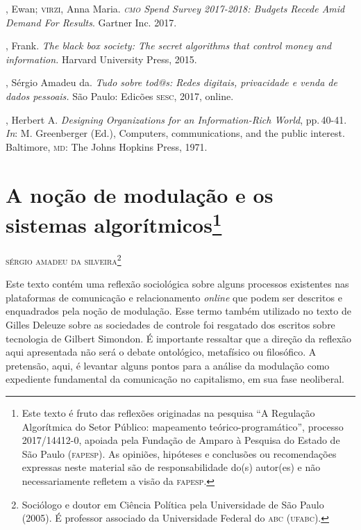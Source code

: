 \begin{bibliohedra}
, Ewan; \textsc{virzi}, Anna Maria. \emph{\textsc{cmo} Spend Survey 2017-2018:
Budgets Recede Amid Demand For Results}. Gartner Inc. 2017.

, Frank. \emph{The black box society: The secret algorithms
that control money and information.} Harvard University Press, 2015.

, Sérgio Amadeu da. \emph{Tudo sobre tod@s: Redes digitais,
privacidade e venda de dados pessoais.} São Paulo: Edicões \textsc{sesc}, 2017,
online.

, Herbert A. \emph{Designing Organizations for an
Information-Rich World}, pp.\,40-41. \emph{In}: M. Greenberger (Ed.), Computers,
communications, and the public interest. Baltimore, \textsc{md}: The Johns
Hopkins Press, 1971.

\end{bibliohedra}


\chapter{A noção de modulação e os sistemas algorítmicos\footnote{Este texto é fruto das reflexões originadas na pesquisa ``A Regulação Algorítmica do Setor Público: mapeamento teórico-programático'', processo 2017/14412-0, apoiada pela Fundação de Amparo à Pesquisa do Estado de São Paulo (\textsc{fapesp}). As opiniões, hipóteses e conclusões ou recomendações expressas neste material são de responsabilidade do(s) autor(es) e não necessariamente refletem a visão da \textsc{fapesp}.}}

\begin{flushright}
\textsc{sérgio amadeu da silveira\footnote{Sociólogo e doutor em Ciência Política pela Universidade de São Paulo (2005). É professor associado da Universidade Federal do \textsc{abc} (\textsc{ufabc}).}}
\end{flushright}

\noindent{}Este texto contém uma reflexão sociológica sobre alguns processos
existentes nas plataformas de comunicação e relacionamento \emph{online} que
podem ser descritos e enquadrados pela noção de modulação. Esse termo
também utilizado no texto de Gilles Deleuze sobre as sociedades de
controle foi resgatado dos escritos sobre tecnologia de Gilbert
Simondon. É importante ressaltar que a direção da reflexão aqui
apresentada não será o debate ontológico, metafísico ou filosófico. A
pretensão, aqui, é levantar alguns pontos para a análise da modulação
como expediente fundamental da comunicação no capitalismo, em sua fase
neoliberal.

